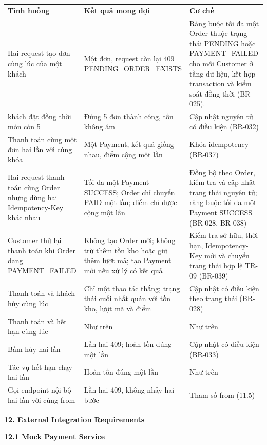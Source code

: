 \documentclass[11pt,a4paper,oneside]{report}
\begin{document}
\begin{longtable}[]{@{}
  >{\raggedright\arraybackslash}p{}
  >{\raggedright\arraybackslash}p{}
  >{\raggedright\arraybackslash}p{}@{}}
\toprule\noalign{}
\endhead
\bottomrule\noalign{}
\endlastfoot
\textbf{Tình huống} & \textbf{Kết quả mong đợi} & \textbf{Cơ chế} \\
Hai request tạo đơn cùng lúc của một khách & Một đơn, request còn lại 409 PENDING\_ORDER\_EXISTS & Ràng buộc tối đa một Order thuộc trạng thái PENDING hoặc PAYMENT\_FAILED cho mỗi Customer ở tầng dữ liệu, kết hợp transaction và kiểm soát đồng thời (BR-025). \\
10 khách đặt đồng thời món còn 5 & Đúng 5 đơn thành công, tồn không âm & Cập nhật nguyên tử có điều kiện (BR-032) \\
Thanh toán cùng một đơn hai lần với cùng khóa & Một Payment, kết quả giống nhau, điểm cộng một lần & Khóa idempotency (BR-037) \\
Hai request thanh toán cùng Order nhưng dùng hai Idempotency-Key khác nhau & Tối đa một Payment SUCCESS; Order chỉ chuyển PAID một lần; điểm chỉ được cộng một lần & Đồng bộ theo Order, kiểm tra và cập nhật trạng thái nguyên tử; ràng buộc tối đa một Payment SUCCESS (BR-028, BR-038) \\
Customer thử lại thanh toán khi Order đang PAYMENT\_FAILED & Không tạo Order mới; không trừ thêm tồn kho hoặc giữ thêm lượt mã; tạo Payment mới nếu xử lý có kết quả & Kiểm tra sở hữu, thời hạn, Idempotency-Key mới và chuyển trạng thái hợp lệ TR-09 (BR-039) \\
Thanh toán và khách hủy cùng lúc & Chỉ một thao tác thắng; trạng thái cuối nhất quán với tồn kho, lượt mã và điểm & Cập nhật có điều kiện theo trạng thái (BR-028) \\
Thanh toán và hết hạn cùng lúc & Như trên & Như trên \\
Bấm hủy hai lần & Lần hai 409; hoàn tồn đúng một lần & Cập nhật có điều kiện (BR-033) \\
Tác vụ hết hạn chạy hai lần & Hoàn tồn đúng một lần & Như trên \\
Gọi endpoint nội bộ hai lần với cùng from & Lần hai 409, không nhảy hai bước & Tham số from (11.5) \\
\end{longtable}

\textbf{12. External Integration Requirements}

\textbf{12.1 Mock Payment Service}
\end{document}
